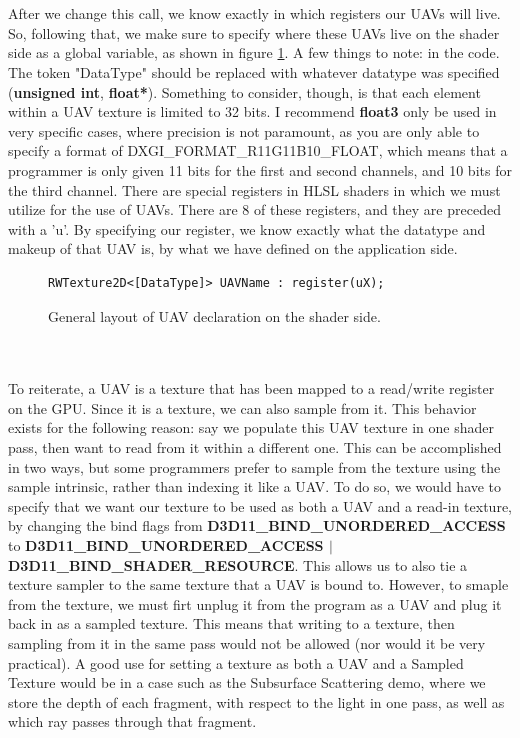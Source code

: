 \documentclass[a4paper, 12pt]{article}
\begin{document}
\noindent \\ \\ After we change this call, we know exactly in which registers
our UAVs will live. So, following that, we make sure to specify where these
UAVs live on the shader side as a global variable, as shown in figure
\ref{code:UAVShaderSide}. A few things to note: in the code. The token
"DataType" should be replaced with whatever datatype was specified
(\textbf{unsigned int}, \textbf{float*}). Something to consider, though, is
that each element within a UAV texture is limited to 32 bits. I recommend
\textbf{float3} only be used in very specific cases, where precision is not
paramount, as you are only able to specify a format of
DXGI\_FORMAT\_R11G11B10\_FLOAT, which means that a programmer is only given 11
bits for the first and second channels, and 10 bits for the third channel.
There are special registers in HLSL shaders in which we must utilize for the
use of UAVs. There are 8 of these registers, and they are preceded with a
'u'. By specifying our register, we know exactly what the datatype and
makeup of that UAV is, by what we have defined on the application side.

\begin{figure}[h]
\begin{lstlisting}[language=HLSL]
RWTexture2D<[DataType]> UAVName : register(uX);
\end{lstlisting}
\caption{General layout of UAV declaration on the shader side.}
\label{code:UAVShaderSide}
\end{figure}

\noindent \\ \\ To reiterate, a UAV is a texture that has been mapped to a
read/write register on the GPU. Since it is a texture, we can also sample from
it. This behavior exists for the following reason: say we populate this UAV
texture in one shader pass, then want to read from it within a different one.
This can be accomplished in two ways, but some programmers prefer to sample
from the texture using the sample intrinsic, rather than indexing it like a
UAV. To do so, we would have to specify that we want our texture to be used as
both a UAV and a read-in texture, by changing the bind flags from
\textbf{D3D11\_BIND\_UNORDERED\_ACCESS} to
\textbf{D3D11\_BIND\_UNORDERED\_ACCESS $|$ D3D11\_BIND\_SHADER\_RESOURCE}.
This allows us to also tie a texture sampler to the same texture that a UAV is
bound to. However, to smaple from the texture, we must firt unplug it from the
program as a UAV and plug it back in as a sampled texture. This means that
writing to a texture, then sampling from it in the same pass would not be
allowed (nor would it be very practical). A good use for setting a texture as
both a UAV and a Sampled Texture would be in a case such as the Subsurface
Scattering demo, where we store the depth of each fragment, with respect to
the light in one pass, as well as which ray passes through that fragment.
\end{document}
